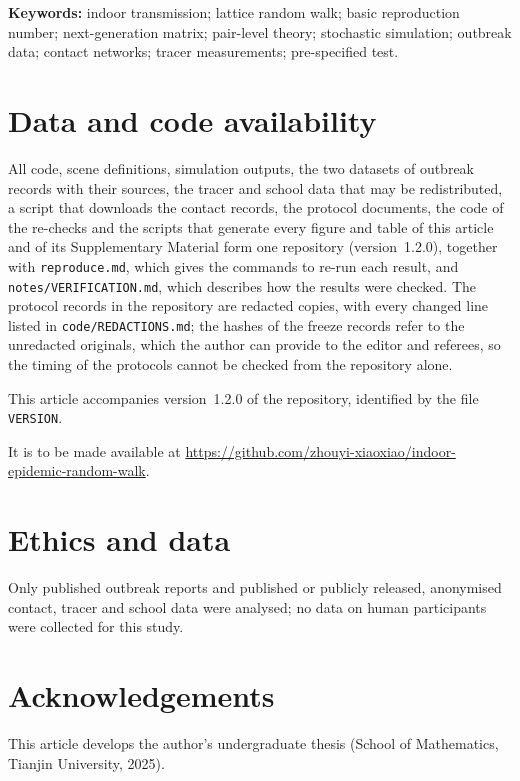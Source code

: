 \documentclass[11pt,a4paper]{article}
\newcommand{\repoversion}{1.2.0}
\newif\ifrepopublic
\newif\ifrepotagged
\begin{document}
\noindent\textbf{Keywords:} indoor transmission; lattice random walk; basic reproduction number;
next-generation matrix; pair-level theory; stochastic simulation; outbreak data; contact networks; tracer
measurements; pre-specified test.










\section*{Data and code availability}
All code, scene definitions, simulation outputs, the two datasets of outbreak records with their sources, the
tracer and school data that may be redistributed, a script that downloads the contact records, the protocol
documents, the code of the re-checks and the scripts that generate every figure and table of this article and of
its Supplementary Material form one repository (version~\repoversion), together with \texttt{reproduce.md}, which
gives the commands to re-run each result, and \texttt{notes/VERIFICATION.md}, which describes how the results were
checked. The protocol records in the repository are redacted copies, with every changed line listed in
\texttt{code/REDACTIONS.md}; the hashes of the freeze records refer to the unredacted originals, which the author
can provide to the editor and referees, so the timing of the protocols cannot be checked from the repository
alone.
\ifrepopublic
The repository is public at \url{https://github.com/zhouyi-xiaoxiao/indoor-epidemic-random-walk}.
\ifrepotagged
This article corresponds to the tag \texttt{v\repoversion}.
\else
This article accompanies version~\repoversion{} of the repository, identified by the file
\texttt{VERSION}.
\fi
\else
It is to be made available at \url{https://github.com/zhouyi-xiaoxiao/indoor-epidemic-random-walk}.
\fi

\section*{Ethics and data}
Only published outbreak reports and published or publicly released, anonymised contact, tracer and school data
were analysed; no data on human participants were collected for this study.

\section*{Acknowledgements}
This article develops the author's undergraduate thesis (School of Mathematics, Tianjin University, 2025).

{\small\setlength{\bibsep}{1pt plus 0.5pt}

}
\end{document}
